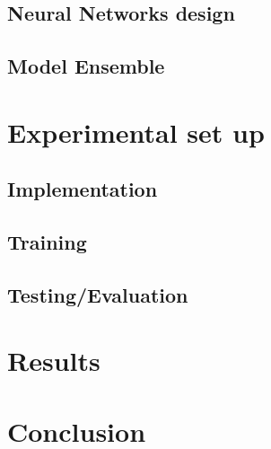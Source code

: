 \documentclass[conference]{IEEEtran}
\begin{document}
\subsection{Neural Networks design}
\label{sec:NN_design}


\subsection{Model Ensemble}



\section{Experimental set up}
\label{sec:experiment}

\subsection{Implementation}
\label{sec:implementation}


\subsection{Training}


\subsection{Testing/Evaluation}



\section{Results}
\label{sec:results}

\section{Conclusion}
\label{sec:conclusion}

\clearpage
\appendix
\end{document}
